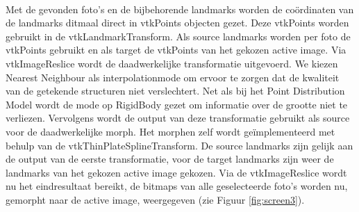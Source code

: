 \\
Met de gevonden foto's en de bijbehorende landmarks worden de co\"{o}rdinaten van de landmarks ditmaal direct in vtkPoints objecten gezet. 
Deze vtkPoints worden gebruikt in de vtkLandmarkTransform. 
Als source landmarks worden per foto de vtkPoints gebruikt en als target de vtkPoints van het gekozen active image. 
Via vtkImageReslice wordt de daadwerkelijke transformatie uitgevoerd. 
We kiezen Nearest Neighbour als interpolationmode om ervoor te zorgen dat de kwaliteit van de getekende structuren niet verslechtert. 
Net als bij het Point Distribution Model wordt de mode op RigidBody gezet om informatie over de grootte niet te verliezen. 
Vervolgens wordt de output van deze transformatie gebruikt als source voor de daadwerkelijke morph. 
Het morphen zelf wordt ge\"{i}mplementeerd met behulp van de vtkThinPlateSplineTransform. 
De source landmarks zijn gelijk aan de output van de eerste transformatie, voor de target landmarks zijn weer de landmarks van het gekozen active image gekozen. 
Via de vtkImageReslice wordt nu het eindresultaat bereikt, de bitmaps van alle geselecteerde foto's worden nu, gemorpht naar de active image, weergegeven (zie Figuur \ref{fig:screen3}).


